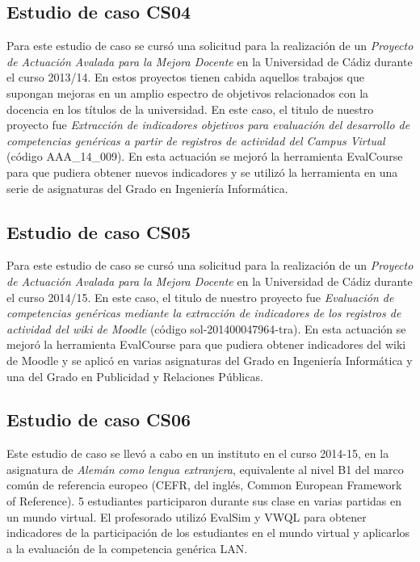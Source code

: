 
	\subsection{Estudio de caso CS04} \label{AA1}

		Para este estudio de caso se cursó una solicitud para la realización de un \emph{Proyecto de Actuación Avalada para la Mejora Docente} en la Universidad de Cádiz durante el curso 2013/14. En estos proyectos tienen cabida aquellos trabajos que supongan mejoras en un amplio espectro de objetivos relacionados con la docencia en los títulos de la universidad. En este caso, el titulo de nuestro proyecto fue \emph{Extracción de indicadores objetivos para evaluación del desarrollo de competencias genéricas a partir de registros de actividad del Campus Virtual} (código AAA\_14\_009). En esta actuación se mejoró la herramienta EvalCourse para que pudiera obtener nuevos indicadores y se utilizó la herramienta en una serie de asignaturas del Grado en Ingeniería Informática. 

	\subsection{Estudio de caso CS05} \label{AA2}

		Para este estudio de caso se cursó una solicitud para la realización de un \emph{Proyecto de Actuación Avalada para la Mejora Docente} en la Universidad de Cádiz durante el curso 2014/15. En este caso, el titulo de nuestro proyecto fue \emph{Evaluación de competencias genéricas mediante la extracción de indicadores de los registros de actividad del wiki de Moodle} (código sol-201400047964-tra). En esta actuación se mejoró la herramienta EvalCourse para que pudiera obtener indicadores del wiki de Moodle y se aplicó en varias asignaturas del Grado en Ingeniería Informática y una del Grado en Publicidad y Relaciones Públicas. 

	\subsection{Estudio de caso CS06}

		Este estudio de caso se llevó a cabo en un instituto en el curso 2014-15, en la asignatura de \emph{Alemán como lengua extranjera}, equivalente al nivel B1 del marco común de referencia europeo (CEFR, del inglés, Common European Framework of Reference). 5 estudiantes participaron durante sus clase en varias partidas en un mundo virtual. El profesorado utilizó EvalSim y VWQL para obtener indicadores de la participación de los estudiantes en el mundo virtual y aplicarlos a la evaluación de la competencia genérica LAN. 

